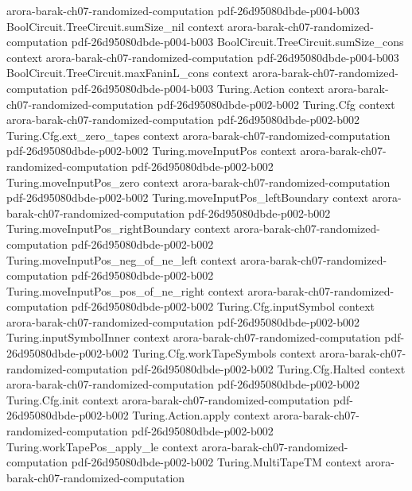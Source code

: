 \begin{theorem}
  {arora-barak-ch07-randomized-computation}
  {pdf-26d95080dbde-p004-b003}
\proofstep
  {BoolCircuit.TreeCircuit.sumSize_nil}
  {context}
  {arora-barak-ch07-randomized-computation}
  {pdf-26d95080dbde-p004-b003}
\proofstep
  {BoolCircuit.TreeCircuit.sumSize_cons}
  {context}
  {arora-barak-ch07-randomized-computation}
  {pdf-26d95080dbde-p004-b003}
\proofstep
  {BoolCircuit.TreeCircuit.maxFaninL_cons}
  {context}
  {arora-barak-ch07-randomized-computation}
  {pdf-26d95080dbde-p004-b003}
\proofstep
  {Turing.Action}
  {context}
  {arora-barak-ch07-randomized-computation}
  {pdf-26d95080dbde-p002-b002}
\proofstep
  {Turing.Cfg}
  {context}
  {arora-barak-ch07-randomized-computation}
  {pdf-26d95080dbde-p002-b002}
\proofstep
  {Turing.Cfg.ext_zero_tapes}
  {context}
  {arora-barak-ch07-randomized-computation}
  {pdf-26d95080dbde-p002-b002}
\proofstep
  {Turing.moveInputPos}
  {context}
  {arora-barak-ch07-randomized-computation}
  {pdf-26d95080dbde-p002-b002}
\proofstep
  {Turing.moveInputPos_zero}
  {context}
  {arora-barak-ch07-randomized-computation}
  {pdf-26d95080dbde-p002-b002}
\proofstep
  {Turing.moveInputPos_leftBoundary}
  {context}
  {arora-barak-ch07-randomized-computation}
  {pdf-26d95080dbde-p002-b002}
\proofstep
  {Turing.moveInputPos_rightBoundary}
  {context}
  {arora-barak-ch07-randomized-computation}
  {pdf-26d95080dbde-p002-b002}
\proofstep
  {Turing.moveInputPos_neg_of_ne_left}
  {context}
  {arora-barak-ch07-randomized-computation}
  {pdf-26d95080dbde-p002-b002}
\proofstep
  {Turing.moveInputPos_pos_of_ne_right}
  {context}
  {arora-barak-ch07-randomized-computation}
  {pdf-26d95080dbde-p002-b002}
\proofstep
  {Turing.Cfg.inputSymbol}
  {context}
  {arora-barak-ch07-randomized-computation}
  {pdf-26d95080dbde-p002-b002}
\proofstep
  {Turing.inputSymbolInner}
  {context}
  {arora-barak-ch07-randomized-computation}
  {pdf-26d95080dbde-p002-b002}
\proofstep
  {Turing.Cfg.workTapeSymbols}
  {context}
  {arora-barak-ch07-randomized-computation}
  {pdf-26d95080dbde-p002-b002}
\proofstep
  {Turing.Cfg.Halted}
  {context}
  {arora-barak-ch07-randomized-computation}
  {pdf-26d95080dbde-p002-b002}
\proofstep
  {Turing.Cfg.init}
  {context}
  {arora-barak-ch07-randomized-computation}
  {pdf-26d95080dbde-p002-b002}
\proofstep
  {Turing.Action.apply}
  {context}
  {arora-barak-ch07-randomized-computation}
  {pdf-26d95080dbde-p002-b002}
\proofstep
  {Turing.workTapePos_apply_le}
  {context}
  {arora-barak-ch07-randomized-computation}
  {pdf-26d95080dbde-p002-b002}
\proofstep
  {Turing.MultiTapeTM}
  {context}
  {arora-barak-ch07-randomized-computation}

\end{theorem}

